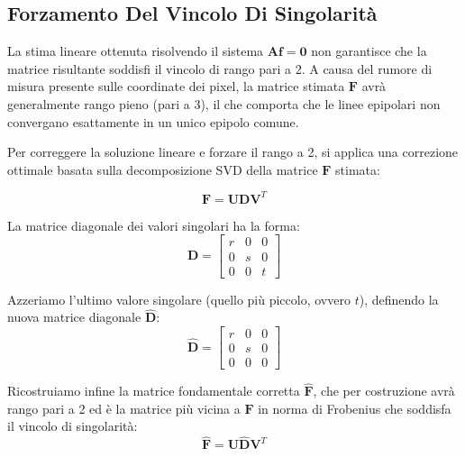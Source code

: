 ﻿\documentclass[11pt, a4paper]{article}
\begin{document}
\subsection{Forzamento Del Vincolo Di Singolarità}

La stima lineare ottenuta risolvendo il sistema $\bm{A}\bm{f} = \bm{0}$ non garantisce che la matrice risultante soddisfi il vincolo di rango pari a 2. A causa del rumore di misura presente sulle coordinate dei pixel, la matrice stimata $\bm{F}$ avrà generalmente rango pieno (pari a 3), il che comporta che le linee epipolari non convergano esattamente in un unico epipolo comune.


Per correggere la soluzione lineare e forzare il rango a 2, si applica una correzione ottimale basata sulla decomposizione SVD della matrice $\bm{F}$ stimata:

\begin{equation}
\bm{F} = \bm{U} \bm{D} \bm{V}^T
\end{equation}

La matrice diagonale dei valori singolari ha la forma:
\[
\bm{D} = \begin{bmatrix} r & 0 & 0 \\ 0 & s & 0 \\ 0 & 0 & t \end{bmatrix}
\]

Azzeriamo l'ultimo valore singolare (quello più piccolo, ovvero $t$), definendo la nuova matrice diagonale $\hat{\bm{D}}$:
\begin{equation}
\hat{\bm{D}} = \begin{bmatrix} r & 0 & 0 \\ 0 & s & 0 \\ 0 & 0 & 0 \end{bmatrix}
\end{equation}

Ricostruiamo infine la matrice fondamentale corretta $\hat{\bm{F}}$, che per costruzione avrà rango pari a 2 ed è la matrice più vicina a $\bm{F}$ in norma di Frobenius che soddisfa il vincolo di singolarità:
\begin{equation}
\hat{\bm{F}} = \bm{U} \hat{\bm{D}} \bm{V}^T
\end{equation}
\end{document}
